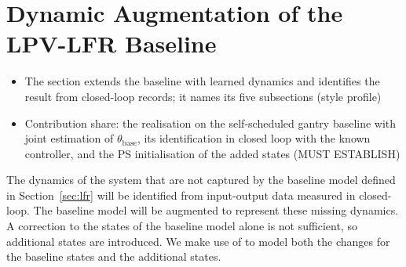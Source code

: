 \section{Dynamic Augmentation of the LPV-LFR Baseline}\label{sec:augmentation}
\ifdraft
\begin{itemize}
\item The section extends the baseline with learned dynamics and identifies the result from closed-loop records; it names its five subsections (style profile)
\item Contribution share: the realisation on the self-scheduled gantry baseline with joint estimation of $\theta_{\mathrm{base}}$, its identification in closed loop with the known controller, and the PS initialisation of the added states (MUST ESTABLISH)
\end{itemize}
\fi
\changelegend

The dynamics of the system that are not captured by the baseline model
defined in Section~\ref{sec:lfr} will be identified from input-output data
measured in closed-loop.
The baseline model will be augmented to represent these missing dynamics.
A correction to the states of the baseline model alone is not sufficient,
so additional states are introduced.
We make use of  to model both the changes for the baseline states
and the additional states.
\\

